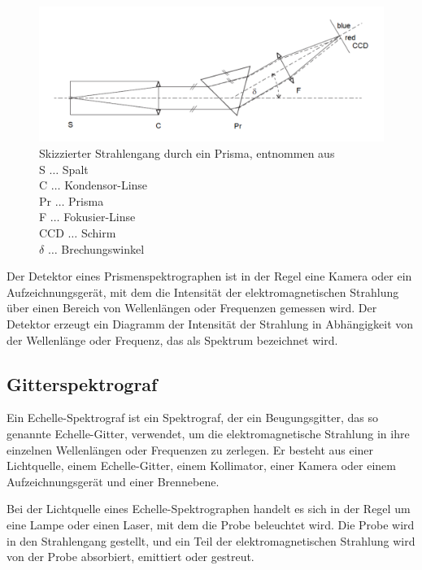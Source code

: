 \documentclass[12pt,english,ngerman]{scrartcl}
\begin{document}
\begin{figure}[H]
	\begin{center}
		\includegraphics[width =\textwidth]{./figures/skizze.png}
	\end{center}
	\caption[Skizzierter Strahlengang durch ein Prisma] {Skizzierter Strahlengang durch ein
		Prisma, entnommen aus \cite{unterlagen} \\
		S \(\dots\) Spalt                       \\
		C \(\dots\) Kondensor-Linse             \\
		Pr \(\dots\) Prisma                     \\
		F \(\dots\) Fokusier-Linse              \\
		CCD \(\dots\) Schirm                    \\
		$\delta$ \(\dots\) Brechungswinkel
	}\label{fig:skizze}
\end{figure}

Der Detektor eines Prismenspektrographen ist in der Regel eine Kamera oder ein
Aufzeichnungsgerät, mit dem die Intensität der elektromagnetischen Strahlung
über einen Bereich von Wellenlängen oder Frequenzen gemessen wird. Der Detektor
erzeugt ein Diagramm der Intensität der Strahlung in Abhängigkeit von der
Wellenlänge oder Frequenz, das als Spektrum bezeichnet wird.

\subsection{Gitterspektrograf}

Ein Echelle-Spektrograf ist ein Spektrograf, der ein Beugungsgitter, das so
genannte Echelle-Gitter, verwendet, um die elektromagnetische Strahlung in ihre
einzelnen Wellenlängen oder Frequenzen zu zerlegen. Er besteht aus einer
Lichtquelle, einem Echelle-Gitter, einem Kollimator, einer Kamera oder einem
Aufzeichnungsgerät und einer Brennebene.

Bei der Lichtquelle eines Echelle-Spektrographen handelt es sich in der Regel
um eine Lampe oder einen Laser, mit dem die Probe beleuchtet wird. Die Probe
wird in den Strahlengang gestellt, und ein Teil der elektromagnetischen
Strahlung wird von der Probe absorbiert, emittiert oder gestreut.
\end{document}
